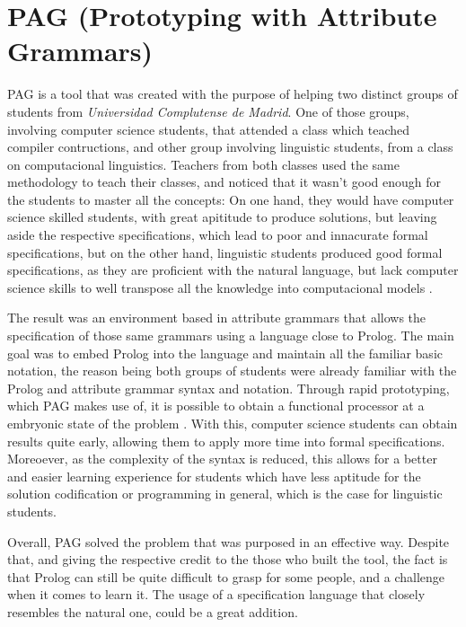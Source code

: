 \section{PAG (Prototyping with Attribute Grammars)}
PAG is a tool that was created with the purpose of helping two distinct groups of students from \emph{Universidad Complutense de Madrid}. 
One of those groups, involving computer science students, that attended a class which teached compiler contructions, and other group involving linguistic students, from a class on computacional linguistics. 
Teachers from both classes used the same methodology to teach their classes, 
and noticed that it wasn't good enough for the students to master all the concepts: On one hand, they would have computer science skilled students, 
with great apititude to produce solutions, but leaving aside the respective specifications, which lead to poor and innacurate formal specifications, but on the other hand, 
linguistic students produced good formal specifications, as they are proficient with the natural language,
but lack computer science skills to well transpose all the knowledge into computacional models \cite{sierra_2006}.

The result was an environment based in attribute grammars that allows the specification of those same grammars using a language close to Prolog. 
The main goal was to embed Prolog into the language and maintain all the familiar basic notation, 
the reason being both groups of students were already familiar with the Prolog and attribute grammar syntax and notation. 
Through rapid prototyping, which PAG makes use of, it is possible to obtain a functional processor at a embryonic state of the problem \cite{sierra_2006}. 
With this, computer science students can obtain results quite early, allowing them to apply more time into formal specifications. 
Moreoever, as the complexity of the syntax is reduced, this allows for a better and easier learning experience for students which have less aptitude for the solution codification or programming in general, 
which is the case for linguistic students.

Overall, PAG solved the problem that was purposed in an effective way. 
Despite that, and giving the respective credit to the those who built the tool, the fact is that Prolog can still be quite difficult to grasp for some people, and a challenge when it comes to learn it. 
The usage of a specification language that closely resembles the natural one, could be a great addition.


